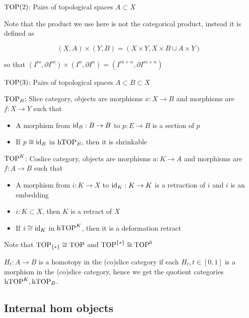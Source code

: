 $\operatorname{TOP}(2)$: Pairs of topological spaces $A\subset X$

Note that the product we use here is not the categorical product, instead it is defined as

\[(X,A)\times(Y,B)=(X\times Y,X\times B\cup A\times Y)\]

so that $\left(I^m,\partial I^m\right)\times\left(I^n,\partial I^n\right)=\left(I^{m+n},\partial I^{m+n}\right)$

$\operatorname{TOP}(3)$: Pairs of topological spaces $A\subset B\subset X$

$\operatorname{TOP}_B$: Slice category, objects are morphisms $x:X\to B$ and morphisms are $f:X\to Y$ such that
\begin{itemize}
    \item A morphism from $\operatorname{id}_B:B\to B$ to $p:E\to B$ is a section of $p$
    \item If $p\cong\operatorname{id}_B$ in $\operatorname{hTOP}_B$, then it is shrinkable
\end{itemize}

$\operatorname{TOP}^K$: Coslice category, objects are morphisms $a:K\to A$ and morphisms are $f:A\to B$ such that
\begin{itemize}
    \item A morphism from $i:K\to X$ to $\operatorname{id}_K:K\to K$ is a retraction of $i$ and $i$ is an embedding
    \item $i:K\subset X$, then $K$ is a retract of $X$
    \item If $i\cong\operatorname{id}_K$ in $\operatorname{hTOP}^K$, then it is a deformation retract
\end{itemize}

Note that $\operatorname{TOP}_{\{*\}}\cong\operatorname{TOP}$ and $\operatorname{TOP}^{\{*\}}\cong\operatorname{TOP}^0$

$H_t:A\to B$ is a homotopy in the (co)slice category if each $H_t,t\in[0,1]$ is a morphism in the (co)slice category, hence we get the quotient categories $\operatorname{hTOP}^K,\operatorname{hTOP}_B$.

\subsection{Internal hom objects}


